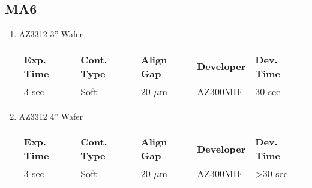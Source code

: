 \subsection{MA6}
\begin{enumerate}
\item AZ3312 3'' Wafer
	\begin{center}
	  \begin{tabular}{|l|l|l|l|l|}
			\hline
			Exp. Time & Cont. Type & Align Gap & Developer & Dev. Time \\
			\hline
			3 sec & Soft & 20 $\mu$m & AZ300MIF & 30 sec \\
			\hline
		\end{tabular}
		\label{tab:MA6_3INCH}
	\end{center}
		
\item AZ3312 4'' Wafer
	\begin{center}
	  \begin{tabular}{|l|l|l|l|l|}
			\hline
			Exp. Time & Cont. Type & Align Gap & Developer & Dev. Time \\
			\hline
			3 sec & Soft & 20 $\mu$m & AZ300MIF & >30 sec \\
			\hline
		\end{tabular}
		\label{tab:MA6_4INCH}
	\end{center}

\end{enumerate}

